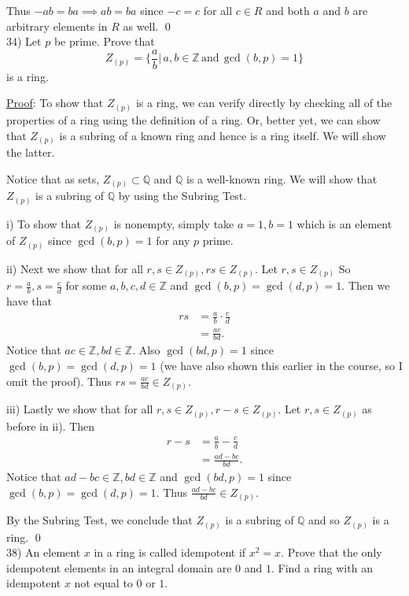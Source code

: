 \documentclass{article}
\begin{document}
Thus $-ab = ba \implies ab = ba$ since $-c = c$ for all $c \in R$ and both $a$ and $b$ are arbitrary elements in $R$ as well. \qed \\

34) Let $p$ be prime. Prove that
$$Z_{(p)} = \big\{ \frac{a}{b} \big\vert \, a, b \in \mathbb{Z} \, \text{and} \, \gcd(b, p) = 1 \big\} $$
is a ring. 

\underline{Proof}: To show that $Z_{(p)}$ is a ring, we can verify directly by checking all of the properties of a ring using the definition of a ring. Or, better yet, we can show that $Z_{(p)}$ is a subring of a known ring and hence is a ring itself. We will show the latter.

Notice that as sets, $Z_{(p)} \subset \mathbb{Q}$ and $\mathbb{Q}$ is a well-known ring. We will show that $Z_{(p)}$ is a subring of $\mathbb{Q}$ by using the Subring Test.

i) To show that $Z_{(p)}$ is nonempty, simply take $a = 1, b = 1$ which is an element of $Z_{(p)}$ since $\gcd(b, p) = 1$ for any $p$ prime.

ii) Next we show that for all $r, s \in Z_{(p)}, rs \in Z_{(p)}$. Let $r, s \in Z_{(p)}$ So $r = \frac ab, s = \frac cd$ for some $a, b, c, d \in \mathbb{Z}$ and $\gcd(b, p) = \gcd(d, p) = 1$. Then we have that
\begin{align*}
	rs &= \frac ab \cdot \frac cd \\
	&= \frac{ac}{bd}.
\end{align*}
Notice that $ac \in \mathbb{Z}, bd \in \mathbb{Z}$. Also $\gcd(bd, p) = 1$ since $\gcd(b, p) = \gcd(d, p) = 1$ (we have also shown this earlier in the course, so I omit the proof). Thus $rs = \frac{ac}{bd} \in Z_{(p)}$.

iii) Lastly we show that for all $r, s \in Z_{(p)}, r - s \in Z_{(p)}$. Let $r, s \in Z_{(p)}$ as before in ii). Then 
\begin{align*}
	r - s &= \frac ab - \frac cd \\
	&= \frac{ad-bc}{bd}.
\end{align*}
Notice that $ad - bc \in \mathbb{Z}, bd \in \mathbb{Z}$ and $\gcd(bd, p) = 1$ since $\gcd(b, p) = \gcd(d, p) = 1$. Thus $\frac{ad-bc}{bd} \in Z_{(p)}.$

By the Subring Test, we conclude that $Z_{(p)}$ is a subring of $\mathbb{Q}$ and so $Z_{(p)}$ is a ring. \qed \\

38) An element $x$ in a ring is called idempotent if $x^2 = x$. Prove that the only idempotent elements in an integral domain are $0$ and $1$. Find a ring with an idempotent $x$ not equal to $0$ or $1$. 
\end{document}
